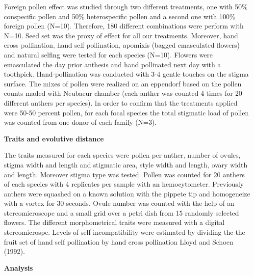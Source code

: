 \documentclass[11pt,a4paper]{article}
\begin{document}
Foreign pollen effect was studied through two different treatments, one
with 50\% conspecific pollen and 50\% heterospecific pollen and a second
one with 100\% foreign pollen (N=10). Therefore, 180 different
combinations were perform with N=10. Seed set was the proxy of effect
for all our treatments. Moreover, hand cross pollination, hand self
pollination, apomixis (bagged emasculated flowers) and natural selfing
were tested for each species (N=10). Flowers were emasculated the day
prior anthesis and hand pollinated next day with a toothpick.
Hand-pollination was conducted with 3-4 gentle touches on the stigma
surface. The mixes of pollen were realized on an eppendorf based on the
pollen counts maded with Neubaeur chamber (each anther was counted 4
times for 20 different anthers per species). In order to confirm that
the treatments applied were 50-50 percent pollen, for each focal species
the total stigmatic load of pollen was counted from one donor of each
family (N=3).

\textbf{Traits and evolutive distance}

The traits measured for each species were pollen per anther, number of
ovules, stigma width and length and stigmatic area, style width and
length, ovary width and length. Moreover stigma type was tested. Pollen
was counted for 20 anthers of each species with 4 replicates per sample
with an hemocytometer. Previously anthers were squashed on a known
solution with the pippete tip and homogeneize with a vortex for 30
seconds. Ovule number was counted with the help of an stereomicroscope
and a small grid over a petri dish from 15 randomly selected flowers.
The different morphometrical traits were measured with a digital
stereomicrospe. Levels of self incompatibility were estimated by
dividing the the fruit set of hand self pollination by hand cross
pollination Lloyd and Schoen (1992).

\textbf{Analysis}
\end{document}
